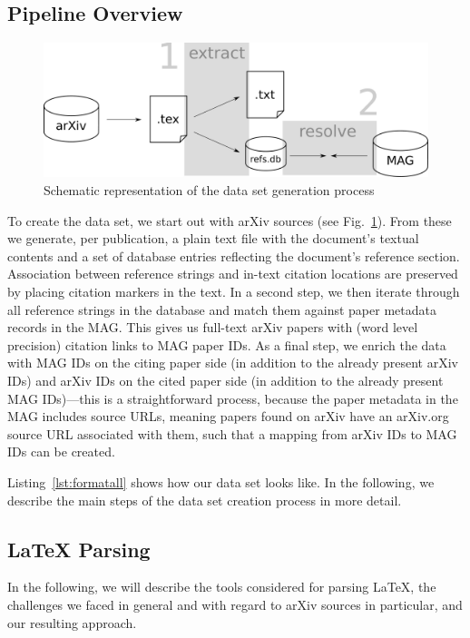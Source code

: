\subsection{Pipeline Overview}

\begin{figure}[tb]
  \centering
    \includegraphics[width=.7\textwidth]{figures/corpus/Fig1.pdf}
  \caption{Schematic representation of the data set generation process}
  \label{fig:datagen}
\end{figure}

To create the data set, we start out with arXiv sources (see Fig.~\ref{fig:datagen}). From these we generate, per publication, a plain text file with the document's textual contents and a set of database entries reflecting the document's reference section. Association between reference strings and in-text citation locations are preserved by placing citation markers in the text. In a second step, we then iterate through all reference strings in the database and match them against paper metadata records in the MAG. This gives us full-text arXiv papers with (word level precision) citation links to MAG paper IDs. As a final step, we enrich the data with MAG IDs on the citing paper side (in addition to the already present arXiv IDs) and arXiv IDs on the cited paper side (in addition to the already present MAG IDs)---this is a straightforward process, because the paper metadata in the MAG includes source URLs, meaning papers found on arXiv have an arXiv.org source URL associated with them, such that a mapping from arXiv IDs to MAG IDs can be created.

Listing~\ref{lst:formatall} shows how our data set looks like. In the following, we describe the main steps of the data set creation process in more detail.

\subsection{\LaTeX{} Parsing}
In the following, we will describe the tools considered for parsing \LaTeX{}, the challenges we faced in general and with regard to arXiv sources in particular, and our resulting approach.


